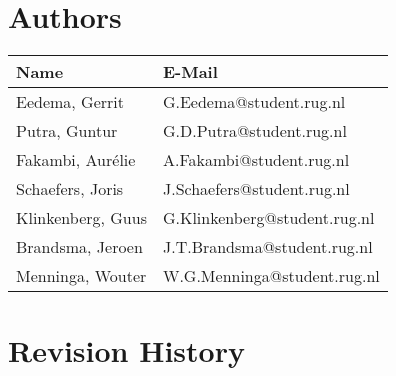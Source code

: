 \section*{Authors}

\begin{tabular}{L{} L{}}
    \textbf{Name} & \textbf{E-Mail} \\ \toprule
	Eedema, Gerrit & G.Eedema@student.rug.nl\\
	Putra, Guntur & G.D.Putra@student.rug.nl\\
	Fakambi, Aurélie & A.Fakambi@student.rug.nl\\
	Schaefers, Joris & J.Schaefers@student.rug.nl\\
	Klinkenberg, Guus & G.Klinkenberg@student.rug.nl\\
	Brandsma, Jeroen & J.T.Brandsma@student.rug.nl\\
	Menninga, Wouter & W.G.Menninga@student.rug.nl\\ \bottomrule
\end{tabular}

\section*{Revision History}

